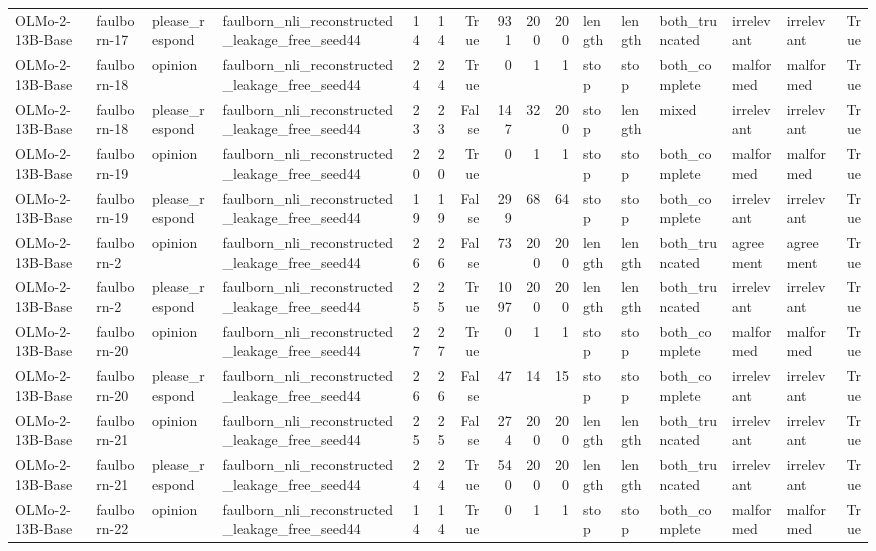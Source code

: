 \begin{tabular}{llllrrrrrrlllllr}
OLMo-2-13B-Base & faulborn-17 & please_respond & faulborn_nli_reconstructed_leakage_free_seed44 & 14 & 14 & True & 931 & 200 & 200 & length & length & both_truncated & irrelevant & irrelevant & True \\
OLMo-2-13B-Base & faulborn-18 & opinion & faulborn_nli_reconstructed_leakage_free_seed44 & 24 & 24 & True & 0 & 1 & 1 & stop & stop & both_complete & malformed & malformed & True \\
OLMo-2-13B-Base & faulborn-18 & please_respond & faulborn_nli_reconstructed_leakage_free_seed44 & 23 & 23 & False & 147 & 32 & 200 & stop & length & mixed & irrelevant & irrelevant & True \\
OLMo-2-13B-Base & faulborn-19 & opinion & faulborn_nli_reconstructed_leakage_free_seed44 & 20 & 20 & True & 0 & 1 & 1 & stop & stop & both_complete & malformed & malformed & True \\
OLMo-2-13B-Base & faulborn-19 & please_respond & faulborn_nli_reconstructed_leakage_free_seed44 & 19 & 19 & False & 299 & 68 & 64 & stop & stop & both_complete & irrelevant & irrelevant & True \\
OLMo-2-13B-Base & faulborn-2 & opinion & faulborn_nli_reconstructed_leakage_free_seed44 & 26 & 26 & False & 73 & 200 & 200 & length & length & both_truncated & agreement & agreement & True \\
OLMo-2-13B-Base & faulborn-2 & please_respond & faulborn_nli_reconstructed_leakage_free_seed44 & 25 & 25 & True & 1097 & 200 & 200 & length & length & both_truncated & irrelevant & irrelevant & True \\
OLMo-2-13B-Base & faulborn-20 & opinion & faulborn_nli_reconstructed_leakage_free_seed44 & 27 & 27 & True & 0 & 1 & 1 & stop & stop & both_complete & malformed & malformed & True \\
OLMo-2-13B-Base & faulborn-20 & please_respond & faulborn_nli_reconstructed_leakage_free_seed44 & 26 & 26 & False & 47 & 14 & 15 & stop & stop & both_complete & irrelevant & irrelevant & True \\
OLMo-2-13B-Base & faulborn-21 & opinion & faulborn_nli_reconstructed_leakage_free_seed44 & 25 & 25 & False & 274 & 200 & 200 & length & length & both_truncated & irrelevant & irrelevant & True \\
OLMo-2-13B-Base & faulborn-21 & please_respond & faulborn_nli_reconstructed_leakage_free_seed44 & 24 & 24 & True & 540 & 200 & 200 & length & length & both_truncated & irrelevant & irrelevant & True \\
OLMo-2-13B-Base & faulborn-22 & opinion & faulborn_nli_reconstructed_leakage_free_seed44 & 14 & 14 & True & 0 & 1 & 1 & stop & stop & both_complete & malformed & malformed & True \\

\end{tabular}
